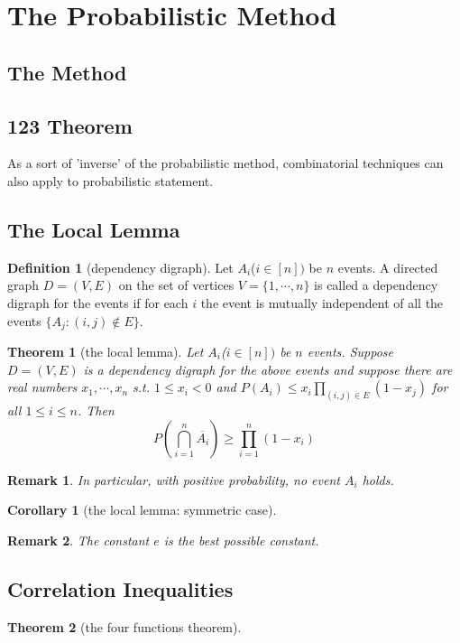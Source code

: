 \documentclass{article}
\newtheorem{Thm}{Theorem}[section]
\newtheorem{Cor}{Corollary}[Thm]
\newtheorem*{Rk}{Remark}
\theoremstyle{definition}
\newtheorem{Def}{Definition}[section]
\begin{document}
\section{The Probabilistic Method}
\subsection{The Method}



\subsection{123 Theorem}
As a sort of 'inverse' of the probabilistic method, combinatorial techniques can also apply to probabilistic statement.


\subsection{The Local Lemma}

\begin{Def}[dependency digraph]
    Let $A_i$($i\in [n])$ be $n$ events. A directed graph $D=(V,E)$ on the set of vertices 
    $V=\{1,\cdots,n\}$ is called a dependency digraph for the events if 
    for each $i$ the event is mutually independent of all the events $\{A_j:(i,j)\notin E\}$.
\end{Def}
\begin{Thm}[the local lemma]
    Let $A_i$($i\in [n])$ be $n$ events. Suppose $D=(V,E)$ is a dependency digraph for the above events and 
    suppose there are real numbers $x_1,\cdots,x_n$ s.t. $1\le x_i<0$ and $P(A_i)\le x_i\prod_{(i,j)\in E}(1-x_j)$
    for all $1\le i\le n$. Then 
    \[ P(\bigcap_{i=1}^n\overline{A_i})\ge \prod_{i=1}^n (1-x_i)\] 
\end{Thm}
\begin{Rk}
    In particular, with positive probability, no event $A_i$ holds.
\end{Rk}

\begin{Cor}[the local lemma: symmetric case]
    
\end{Cor}
\begin{Rk}
    The constant $e$ is the best possible constant.
\end{Rk}


\subsection{Correlation Inequalities}
\begin{Thm}[the four functions theorem]
    
\end{Thm}
\end{document}
